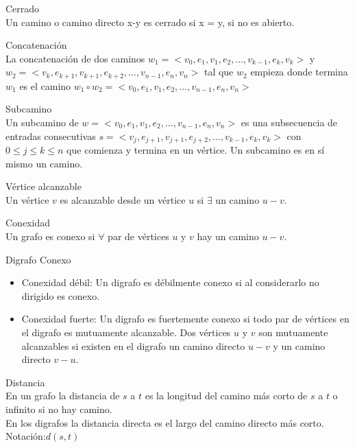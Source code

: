 \documentclass{article}
\begin{document}
\begin{defn}
Cerrado \\ Un camino o camino directo x-y es cerrado si x = y, si no es abierto.
\end{defn}

\begin{defn}
Concatenación \\ La concatenación de dos caminos $w_{1} = < v_{0}, e_{1}, v_{1}, e_{2},..., v_{k-1}, e_{k}, v_{k} >$ y $w_{2} = < v_{k}, e_{k+1}, v_{k+1}, e_{k+2},..., v_{n-1}, e_{n}, v_{n} >$ tal que $w_{2}$ empieza donde termina $w_{1}$ es el camino $w_{1}\circ w_{2} = < v_{0}, e_{1}, v_{1}, e_{2},..., v_{n-1}, e_{n}, v_{n} >$
\end{defn}

\begin{defn}
Subcamino \\ Un subcamino de $w = < v_{0}, e_{1}, v_{1}, e_{2},..., v_{n-1}, e_{n}, v_{n} >$ es una subsecuencia de entradas consecutivas $s = < v_{j}, e_{j+1}, v_{j+1}, e_{j+2},..., v_{k-1}, e_{k}, v_{k} >$ con $0\leq j \leq k \leq n$ que comienza y termina en un vértice. Un subcamino es en sí mismo un camino.
\end{defn}

\begin{defn}
Vértice alcanzable \\  Un vértice $v$ es alcanzable desde un vértice $u$ si $\exists$ un camino $u-v$.
\end{defn}

\begin{defn}
Conexidad \\ Un grafo es conexo si $\forall$ par de vértices $u$ y $v$ hay un camino $u-v$.
\end{defn}

\begin{defn}
Digrafo Conexo
\begin{itemize}
    \item Conexidad débil: Un digrafo es débilmente conexo si al considerarlo no dirigido es conexo.
    \item Conexidad fuerte: Un digrafo es fuertemente conexo si todo par de vértices en el digrafo es mutuamente alcanzable. Dos vértices $u$ y $v$ son mutuamente alcanzables si existen en el digrafo un camino directo $u-v$ y un camino directo $v-u$.
\end{itemize} 
\end{defn}

\begin{defn}
Distancia \\ En un grafo la distancia de $s$ a $t$ es la longitud del camino más corto de $s$ a $t$ o infinito si no hay camino.\\
En los digrafos la distancia directa es el largo del camino directo más corto.\\
Notación:$d(s,t)$
\end{defn}
\end{document}
